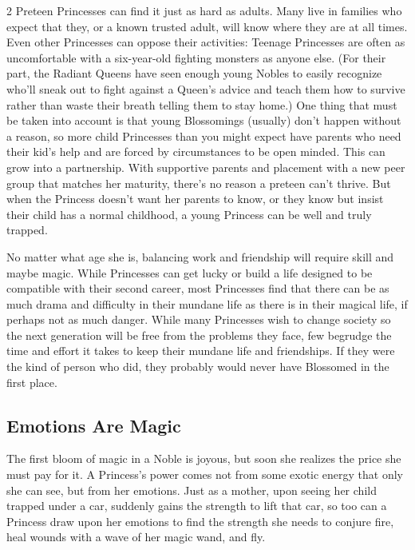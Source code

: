 \begin{multicols}{2}
Preteen Princesses can find it just as hard as adults. Many live in families who expect that they, or a known trusted adult, will know where they are at all times. Even other Princesses can oppose their activities: Teenage Princesses are often as uncomfortable with a six-year-old fighting monsters as anyone else. (For their part, the Radiant Queens have seen enough young Nobles to easily recognize who'll sneak out to fight against a Queen's advice and teach them how to survive rather than waste their breath telling them to stay home.) One thing that must be taken into account is that young Blossomings (usually) don't happen without a reason, so more child Princesses than you might expect have parents who need their kid's help and are forced by circumstances to be open minded. This can grow into a partnership. With supportive parents and placement with a new peer group that matches her maturity, there's no reason a preteen can't thrive. But when the Princess doesn't want her parents to know, or they know but insist their child has a normal childhood, a young Princess can be well and truly trapped.

No matter what age she is, balancing work and friendship will require skill and maybe magic. While Princesses can get lucky or build a life designed to be compatible with their second career, most Princesses find that there can be as much drama and difficulty in their mundane life as there is in their magical life, if perhaps not as much danger. While many Princesses wish to change society so the next generation will be free from the problems they face, few begrudge the time and effort it takes to keep their mundane life and friendships. If they were the kind of person who did, they probably would never have Blossomed in the first place. 

\subsection*{Emotions Are Magic}

The first bloom of magic in a Noble is joyous, but soon she realizes the price she must pay for it. A Princess's power comes not from some exotic energy that only she can see, but from her emotions. Just as a mother, upon seeing her child trapped under a car, suddenly gains the strength to lift that car, so too can a Princess draw upon her emotions to find the strength she needs to conjure fire, heal wounds with a wave of her magic wand, and fly. 


\end{multicols}
